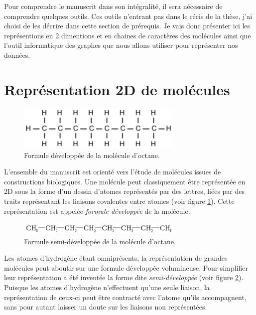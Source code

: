 Pour comprendre le manuscrit dans son intégralité, il sera nécessaire de comprendre quelques outils.
Ces outils n'entrant pas dans le récis de la thèse, j'ai choisi de les décrire dans cette section de prérequis.
Je vais donc présenter ici les représentions en 2 dimentions et en chaines de caractères des molécules ainsi que l'outil informatique des graphes que nous allons utiliser pour représenter nos données.

\section{Représentation 2D de molécules}

\begin{figure}[h!]
  \begin{center}
    \includegraphics[width=300px]{Figures/Prerequis/developpee.png}
    \caption{\label{dev}Formule développée de la molécule d'octane.}
  \end{center}
\end{figure}

L'ensemble du manuscrit est orienté vers l'étude de molécules issues de constructions biologiques.
Une molécule peut classiquement être représentée en 2D sous la forme d'un dessin d'atomes représentés par des lettres, liées par des traits représentant les liaisons covalentes entre atomes (voir figure \ref{dev}).
Cette représentation est appelée \textit{formule développée} de la molécule.

\begin{figure}[h!]
  \begin{center}
    \includegraphics[width=300px]{Figures/Prerequis/semi.png}
    \caption{\label{semi}Formule semi-développée de la molécule d'octane.}
  \end{center}
\end{figure}

Les atomes d'hydrogène étant omniprésents, la représentation de grandes molécules peut aboutir sur une formule développée volumineuse.
Pour simplifier leur représentation a été inventée la forme dite \textit{semi-développée} (voir figure \ref{semi}).
Puisque les atomes d'hydrogène n'effectuent qu'une seule liaison, la représentation de ceux-ci peut être contracté avec l'atome qu'ils accompagnent, sans pour autant laisser un doute sur les liaisons non représentées.


